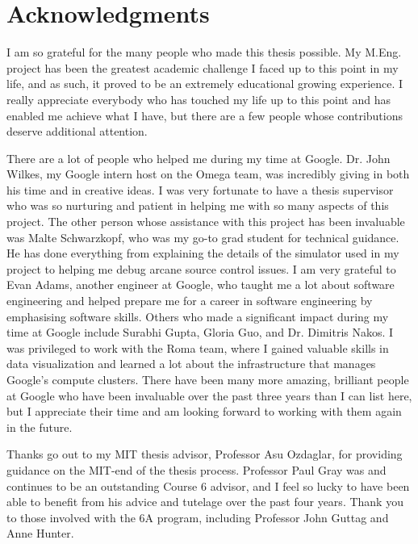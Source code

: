 % 


\cleardoublepage


\section*{Acknowledgments}


I am so grateful for the many people who made this thesis possible. My M.Eng. project has been the greatest academic challenge I faced up to this point in my life, and as such, it proved to be an extremely educational growing experience.  I really appreciate everybody who has touched my life up to this point and has enabled me achieve what I have, but there are a few people whose contributions deserve additional attention.


There are a lot of people who helped me during my time at Google. Dr. John Wilkes, my Google intern host on the Omega team, was incredibly giving in both his time and in creative ideas. I was very fortunate to have a thesis supervisor who was so nurturing and patient in helping me with so many aspects of this project. The other person whose assistance with this project has been invaluable was Malte Schwarzkopf, who was my go-to grad student for technical guidance. He has done everything from explaining the details of the simulator used in my project to helping me debug arcane source control issues. I am very grateful to Evan Adams, another engineer at Google, who taught me a lot about software engineering and helped prepare me for a career in software engineering by emphasising software skills. Others who made a significant impact during my time at Google include Surabhi Gupta, Gloria Guo, and Dr. Dimitris Nakos. I was privileged to work with the Roma team, where I gained valuable skills in data visualization and learned a lot about the infrastructure that manages Google's compute clusters. There have been many more amazing, brilliant people at Google who have been invaluable over the past three years than I can list here, but I appreciate their time and am looking forward to working with them again in the future.


Thanks go out to my MIT thesis advisor, Professor Asu Ozdaglar, for providing guidance on the MIT-end of the thesis process. Professor Paul Gray was and continues to be an outstanding Course 6 advisor, and I feel so lucky to have been able to benefit from his advice and tutelage over the past four years. Thank you to those involved with the 6A program, including Professor John Guttag and Anne Hunter.


